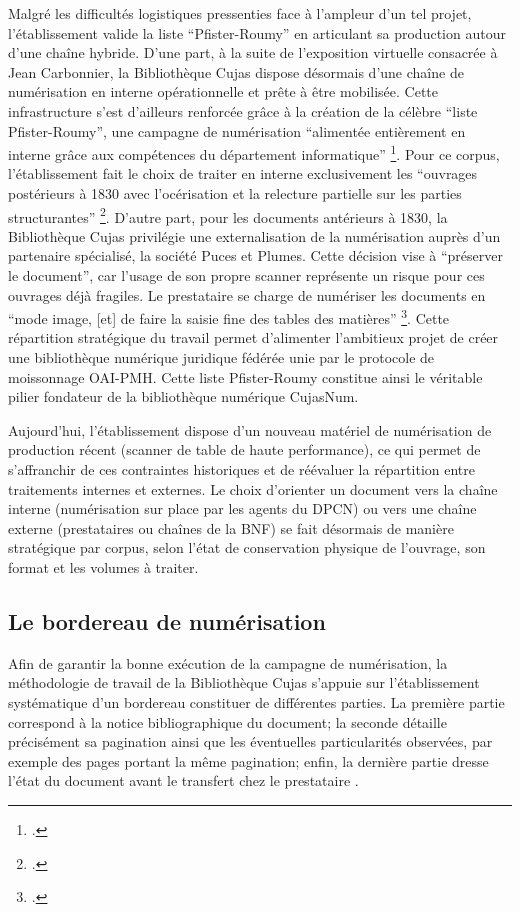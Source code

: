 Malgré les difficultés logistiques pressenties face à l'ampleur d'un tel projet, l'établissement valide la liste \enquote{Pfister-Roumy} en articulant sa production autour d'une chaîne hybride. D'une part, à la suite de l'exposition virtuelle consacrée à Jean Carbonnier, la Bibliothèque Cujas dispose désormais d'une chaîne de numérisation en interne opérationnelle et prête à être mobilisée. Cette infrastructure s'est d'ailleurs renforcée grâce à la création de la célèbre \enquote{liste Pfister-Roumy}, une campagne de numérisation \enquote{alimentée entièrement en interne grâce aux compétences du département informatique} \footcite{2007RefonteProgramme}. Pour ce corpus, l'établissement fait le choix de traiter en interne exclusivement les \enquote{ouvrages postérieurs à 1830 avec l'océrisation et la relecture partielle sur les parties structurantes} \footcite{2007RefonteProgramme}. D'autre part, pour les documents antérieurs à 1830, la Bibliothèque Cujas privilégie une externalisation de la numérisation auprès d'un partenaire spécialisé, la société Puces et Plumes. Cette décision vise à \enquote{préserver le document}, car l'usage de son propre scanner représente un risque pour ces ouvrages déjà fragiles. Le prestataire se charge de numériser les documents en \enquote{mode image, [et] de faire la saisie fine des tables des matières} \footcite{2007RefonteProgramme}. Cette répartition stratégique du travail permet d'alimenter l'ambitieux projet de créer une bibliothèque numérique juridique fédérée unie par le protocole de moissonnage \ac{OAI-PMH}. Cette liste Pfister-Roumy constitue ainsi le véritable pilier fondateur de la bibliothèque numérique CujasNum.

Aujourd'hui, l'établissement dispose d'un nouveau matériel de numérisation de production récent (scanner de table de haute performance), ce qui permet de s'affranchir de ces contraintes historiques et de réévaluer la répartition entre traitements internes et externes. Le choix d'orienter un document vers la chaîne interne (numérisation sur place par les agents du \ac{DPCN}) ou vers une chaîne externe (prestataires ou chaînes de la \ac{BNF}) se fait désormais de manière stratégique par corpus, selon l'état de conservation physique de l'ouvrage, son format et les volumes à traiter.

\subsection{Le bordereau de numérisation}
Afin de garantir la bonne exécution de la campagne de numérisation, la méthodologie de travail de la Bibliothèque Cujas s'appuie sur l'établissement systématique d'un bordereau constituer de différentes parties. La première partie correspond à la notice bibliographique du document; la seconde détaille précisément sa pagination ainsi que les éventuelles particularités observées, par exemple des pages portant la même pagination; enfin, la dernière partie dresse l'état du document avant le transfert chez le prestataire .

